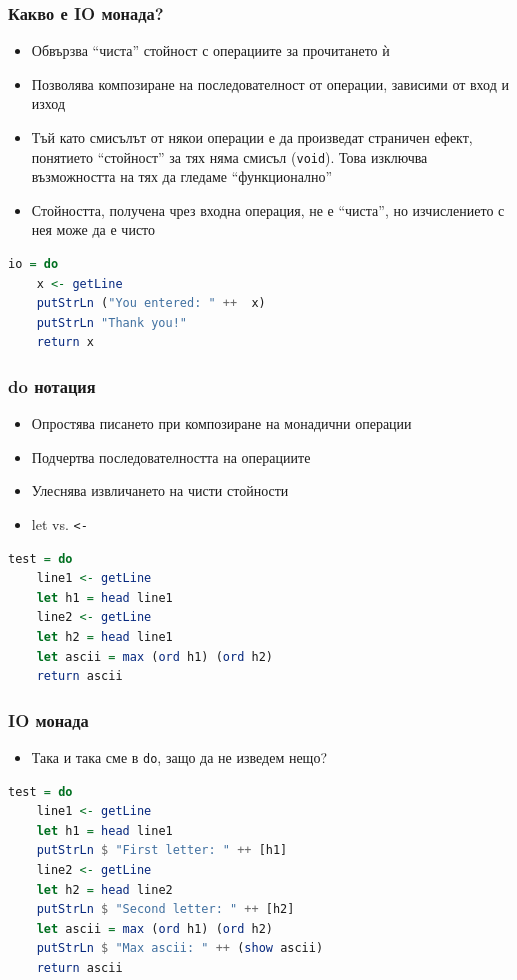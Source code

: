 \documentclass{beamer}
\begin{document}
\begin{frame}[fragile]
  \frametitle{Какво е IO монада?}
\begin{itemize}
  \item Обвързва ``чиста'' стойност с операциите за прочитането ѝ
  \item Позволява композиране на последователност от операции, зависими от вход и изход
  \item Тъй като смисълът от някои операции е да произведат страничен ефект, понятието ``стойност'' за тях няма смисъл (\texttt{void}). Това изключва възможността на тях да гледаме ``функционално''
  \item Стойността, получена чрез входна операция, не е ``чиста'', но изчислението с нея може да е чисто
\end{itemize}

\begin{lstlisting}[basicstyle=\small,language=Haskell]
io = do 
    x <- getLine
    putStrLn ("You entered: " ++  x)
    putStrLn "Thank you!"
    return x
\end{lstlisting}
  
\end{frame}


\begin{frame}[fragile]
  \frametitle{do нотация}
\begin{itemize}
  \item Опростява писането при композиране на монадични операции
  \item Подчертва последователността на операциите
  \item Улеснява извличането на чисти стойности
  \item let vs. \verb#<-#
\end{itemize}
\begin{lstlisting}[basicstyle=\small,language=Haskell]
test = do
    line1 <- getLine
    let h1 = head line1
    line2 <- getLine
    let h2 = head line1
    let ascii = max (ord h1) (ord h2)
    return ascii
\end{lstlisting}
\end{frame}

\begin{frame}[fragile]
  \frametitle{IO монада}
\begin{itemize}
  \item Така и така сме в \verb#do#, защо да не изведем нещо?
\end{itemize}
\begin{lstlisting}[basicstyle=\small,language=Haskell]
test = do
    line1 <- getLine
    let h1 = head line1
    putStrLn $ "First letter: " ++ [h1]
    line2 <- getLine
    let h2 = head line2
    putStrLn $ "Second letter: " ++ [h2]
    let ascii = max (ord h1) (ord h2)
    putStrLn $ "Max ascii: " ++ (show ascii)
    return ascii
\end{lstlisting}
\end{frame}







\end{document}
